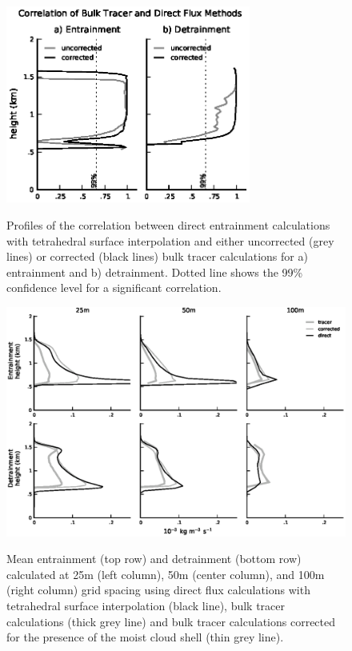 \documentclass[12pt]{article}
\begin{document}
\begin{figure}[t]
  \noindent\includegraphics[width=19pc,angle=0]{./figures/correlations_core}\\
  \caption{Profiles of the correlation between direct entrainment calculations
with tetrahedral surface interpolation and either uncorrected (grey lines) or 
corrected (black lines) bulk tracer calculations for a) entrainment and b) 
detrainment.  Dotted line shows the 99\% confidence level for a significant 
correlation.}\label{fig:correlations}
\end{figure}

\begin{figure}[t]
  \noindent\includegraphics[width=40pc,angle=0]{./figures/resolution_dependence_core}\\
  \caption{Mean entrainment (top row) and detrainment (bottom row) calculated
at 25m (left column), 50m (center column), and 100m (right column) grid 
spacing using direct flux calculations with tetrahedral surface interpolation 
(black line), bulk tracer calculations (thick grey line) and bulk tracer 
calculations corrected for the presence of the moist cloud shell (thin grey 
line).}\label{fig:resolution_dependence}
\end{figure}
\end{document}
